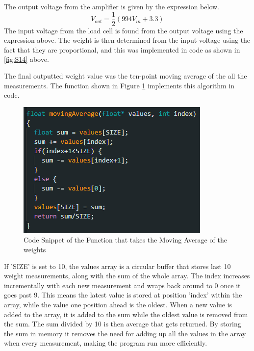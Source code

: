 \documentclass[class=report,11pt,crop=false]{standalone}
\begin{document}
	The output voltage from the amplifier is given by the expression below. 
	\[V_{out} = \frac{1}{2}\left(994V_{in} + 3.3\right) \]
	The input voltage from the load cell is found from the output voltage using the expression above. The weight is then determined from the input voltage using the fact that they are proportional, and this was implemented in code as shown in \ref{fig:S14} above.
	
	The final outputted weight value was the ten-point moving average of the all the measurements. The function shown in Figure \ref{fig:S15} implements this algorithm in code.
	\begin{figure}[h!]
		\centering
		\includegraphics[width=0.5\linewidth]{Figures/MovingAverage.png}
		\caption{Code Snippet of the Function that takes the Moving Average of the weights}
		\label{fig:S15}
	\end{figure}
	If 'SIZE' is set to 10, the values array is a circular buffer that stores last 10 weight measurements, along with the sum of the whole array. The index increases incrementally with each new measurement and wraps back around to 0 once it goes past 9. This means the latest value is stored at position 'index' within the array, while the value one position ahead is the oldest. When a new value is added to the array, it is added to the sum while the oldest value is removed from the sum. The sum divided by 10 is then average that gets returned. By storing the sum in memory it removes the need for adding up all the values in the array when every measurement, making the program run more efficiently.
	
\end{document}
